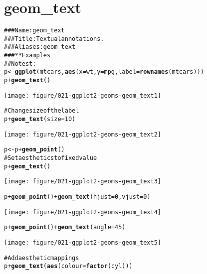 \documentclass[a4paper,titlepage]{tufte-handout}\usepackage{graphicx, color}
\makeatletter
\def\maxwidth{ %
  \ifdim\Gin@nat@width>\linewidth
    \linewidth
  \else
    \Gin@nat@width
  \fi
}
\newcommand{\hlfunctioncall}[1]{\textcolor[rgb]{0.501960784313725,0,0.329411764705882}{\textbf{#1}}}%
\newcommand{\hlcomment}[1]{\textcolor[rgb]{0.180392156862745,0.6,0.341176470588235}{#1}}%
\newenvironment{kframe}{%
 \def\at@end@of@kframe{}%
 \ifinner\ifhmode%
  \def\at@end@of@kframe{\end{minipage}}%
  \begin{minipage}{\columnwidth}%
 \fi\fi%
 \def\FrameCommand##1{\hskip\@totalleftmargin \hskip-\fboxsep
 \colorbox{shadecolor}{##1}\hskip-\fboxsep
     \hskip-\linewidth \hskip-\@totalleftmargin \hskip\columnwidth}%
 \MakeFramed {\advance\hsize-\width
   \@totalleftmargin\z@ \linewidth\hsize
   \@setminipage}}%
 {\par\unskip\endMakeFramed%
 \at@end@of@kframe}
\newenvironment{knitrout}{}{} %
\makeatother
\begin{document}
\section{geom\_text}

\begin{knitrout}
\color{fgcolor}\begin{kframe}
\begin{alltt}
\hlcomment{### Name: geom_text}
\hlcomment{### Title: Textual annotations.}
\hlcomment{### Aliases: geom_text}
\hlcomment{### ** Examples}
\hlcomment{## No test: }
p <- \hlfunctioncall{ggplot}(mtcars, \hlfunctioncall{aes}(x=wt, y=mpg, label=\hlfunctioncall{rownames}(mtcars)))
p + \hlfunctioncall{geom_text}()
\end{alltt}
\end{kframe}\texttt{[image: figure/021-ggplot2-geoms-geom\_text1]} \begin{kframe}\begin{alltt}
\hlcomment{# Change size of the label}
p + \hlfunctioncall{geom_text}(size=10)
\end{alltt}
\end{kframe}\texttt{[image: figure/021-ggplot2-geoms-geom\_text2]} \begin{kframe}\begin{alltt}
p <- p + \hlfunctioncall{geom_point}()
\hlcomment{# Set aesthetics to fixed value}
p + \hlfunctioncall{geom_text}()
\end{alltt}
\end{kframe}\texttt{[image: figure/021-ggplot2-geoms-geom\_text3]} \begin{kframe}\begin{alltt}
p + \hlfunctioncall{geom_point}() + \hlfunctioncall{geom_text}(hjust=0, vjust=0)
\end{alltt}
\end{kframe}\texttt{[image: figure/021-ggplot2-geoms-geom\_text4]} \begin{kframe}\begin{alltt}
p + \hlfunctioncall{geom_point}() + \hlfunctioncall{geom_text}(angle = 45)
\end{alltt}
\end{kframe}\texttt{[image: figure/021-ggplot2-geoms-geom\_text5]} \begin{kframe}\begin{alltt}
\hlcomment{# Add aesthetic mappings}
p + \hlfunctioncall{geom_text}(\hlfunctioncall{aes}(colour=\hlfunctioncall{factor}(cyl)))

\end{alltt}
\end{kframe}
\end{knitrout}
\end{document}

